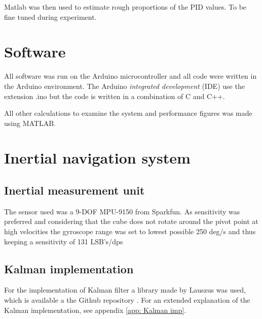 \documentclass[a4paper,11pt]{kth-mag}
\begin{document}
Matlab was then used to estimate rough proportions of the PID values. To be fine tuned during experiment.


\section{Software}
All software was run on the Arduino microcontroller and all code were written in the Arduino environment. The Arduino \textit{integrated development} (IDE) use the extension .ino but the code is written in a combination of C and C++.

All other calculations to examine the system and performance figures was made using MATLAB.

\section{Inertial navigation system}

\subsection{Inertial measurement unit}
The sensor used was a 9-DOF MPU-9150 from Sparkfun. As sensitivity was preferred and considering that the cube does not rotate around the pivot point at high velocities the gyroscope range was set to lowest possible 250 deg/s and thus keeping a sensitivity of 131 LSB's/dps


\subsection{Kalman implementation}
For the implementation of Kalman filter a library made by Lauszus was used, which is available a the Github repository \cite{TKJkalman}. For an extended explanation of the Kalman implementation, see appendix \ref{app: Kalman imp}.
\end{document}
